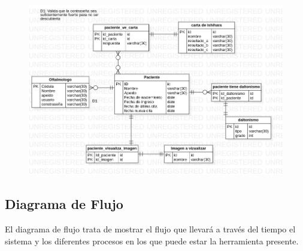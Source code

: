 \documentclass[10pt]{article}
\begin{document}
\begin{figure}[H]
	\begin{center}
\includegraphics[scale = 0.50]{UML/ERDDiagram1.jpg}
	\end{center} 
\end{figure}

\subsection{Diagrama de Flujo}

El diagrama de flujo trata de mostrar el flujo que llevará a través del tiempo el sistema y los diferentes procesos en los que puede estar la herramienta presente.
\end{document}
